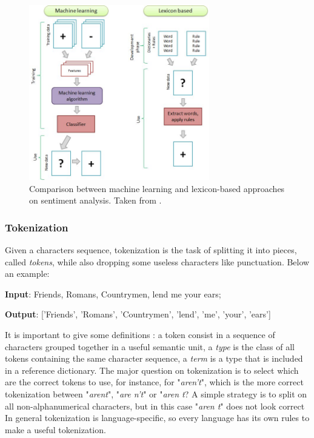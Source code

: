 \begin{figure}[ht]
	\centering
	\includegraphics[width=0.7\textwidth]{figures/Machine-learning-and-lexicon-based-approaches-to-sentiment-analysis.jpg}
	\caption{Comparison between machine learning and lexicon-based approaches on sentiment analysis. Taken from \cite{figure-comparative}.}
	\label{fig:mllbapp}
\end{figure}

\subsubsection{Tokenization}
Given a characters sequence, tokenization is the task of splitting it into pieces, called \textit{tokens}, while also dropping some useless characters like punctuation. Below an example:
\begin{description}
\item \textbf{Input}: Friends, Romans, Countrymen, lend me your ears;
\item \textbf{Output}: ['Friends', 'Romans', 'Countrymen', 'lend', 'me', 'your', 'ears']
\end{description}
It is important to give some definitions \cite{Manning:2008:IIR:1394399}: a token consist in a sequence of characters grouped together in a useful semantic unit, a \textit{type} is the class of all tokens containing the same character sequence, a \textit{term} is a type that is included in a reference dictionary. The major question on tokenization is to select which are the correct tokens to use, for instance, for "\textit{aren't}", which is the more correct tokenization between "\textit{arent}", "\textit{are n't}" or "\textit{aren t}? A simple strategy is to split on all non-alphanumerical characters, but in this case "\textit{aren t}" does not look correct
In general tokenization is language-specific, so every language has its own rules to make a useful tokenization.

